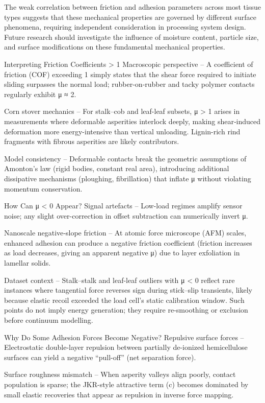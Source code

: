 \documentclass[xcolor=dvipsnames,10pt,hidelinks]{article}
\begin{document}
\begin{itemize}
The weak correlation between friction and adhesion parameters across most tissue types suggests that these mechanical properties are governed by different surface phenomena, requiring independent consideration in processing system design. Future research should investigate the influence of moisture content, particle size, and surface modifications on these fundamental mechanical properties.

Interpreting Friction Coefficients > 1
Macroscopic perspective – A coefficient of friction (COF) exceeding 1 simply states that the shear force required to initiate sliding surpasses the normal load; rubber-on-rubber and tacky polymer contacts regularly exhibit μ ≈ 2.

Corn stover mechanics – For stalk–cob and leaf-leaf subsets, μ > 1 arises in measurements where deformable asperities interlock deeply, making shear‐induced deformation more energy-intensive than vertical unloading. Lignin-rich rind fragments with fibrous asperities are likely contributors.

Model consistency – Deformable contacts break the geometric assumptions of Amonton’s law (rigid bodies, constant real area), introducing additional dissipative mechanisms (ploughing, fibrillation) that inflate μ without violating momentum conservation.

How Can μ < 0 Appear?
Signal artefacts – Low-load regimes amplify sensor noise; any slight over-correction in offset subtraction can numerically invert μ.

Nanoscale negative‐slope friction – At atomic force microscope (AFM) scales, enhanced adhesion can produce a negative friction coefficient (friction increases as load decreases, giving an apparent negative μ) due to layer exfoliation in lamellar solids.

Dataset context – Stalk–stalk and leaf-leaf outliers with μ < 0 reflect rare instances where tangential force reverses sign during stick–slip transients, likely because elastic recoil exceeded the load cell’s static calibration window. Such points do not imply energy generation; they require re-smoothing or exclusion before continuum modelling.

Why Do Some Adhesion Forces Become Negative?
Repulsive surface forces – Electrostatic double-layer repulsion between partially de-ionized hemicellulose surfaces can yield a negative “pull-off” (net separation force).

Surface roughness mismatch – When asperity valleys align poorly, contact population is sparse; the JKR-style attractive term (c) becomes dominated by small elastic recoveries that appear as repulsion in inverse force mapping.


\end{itemize}
\end{document}
